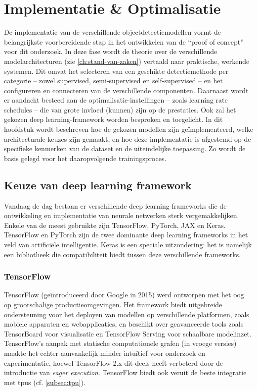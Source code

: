 \chapter{Implementatie \& Optimalisatie}
\label{ch:implementatie}

De implementatie van de verschillende objectdetectiemodellen vormt de belangrijkste voorbereidende stap in het ontwikkelen van de ``proof of concept'' voor dit onderzoek. In deze fase wordt de theorie over de verschillende modelarchitecturen (zie \ref{ch:stand-van-zaken}) vertaald naar praktische, werkende systemen. Dit omvat het selecteren van een geschikte detectiemethode per categorie -- zowel supervised, semi-supervised en self-supervised -- en het configureren en connecteren van de verschillende componenten. Daarnaast wordt er aandacht besteed aan de optimalisatie-instellingen -- zoals learning rate schedules -- die van grote invloed (kunnen) zijn op de prestaties. Ook zal het gekozen deep learning-framework worden besproken en toegelicht. In dit hoofdstuk wordt beschreven hoe de gekozen modellen zijn geïmplementeerd, welke architecturale keuzes zijn gemaakt, en hoe deze implementatie is afgestemd op de specifieke kenmerken van de dataset en de uiteindelijke toepassing. Zo wordt de basis gelegd voor het daaropvolgende trainingsproces.

\section{Keuze van deep learning framework}

Vandaag de dag bestaan er verschillende deep learning frameworks die de ontwikkeling en implementatie van neurale netwerken sterk vergemakkelijken. Enkele van de meest gebruikte zijn TensorFlow, PyTorch, JAX en Keras. TensorFlow en PyTorch zijn de twee dominante deep learning frameworks in het veld van artificiële intelligentie. Keras is een speciale uitzondering: het is namelijk een bibliotheek die compatibiliteit biedt tussen deze verschillende frameworks.

\subsection{TensorFlow}

TensorFlow (geïntroduceerd door Google in 2015) werd ontworpen met het oog op grootschalige productieomgevingen. Het framework biedt uitgebreide ondersteuning voor het deployen van modellen op verschillende platformen, zoals mobiele apparaten en webapplicaties, en beschikt over geavanceerde tools zoals TensorBoard voor visualisatie en TensorFlow Serving voor schaalbare modelinzet. TensorFlow’s aanpak met statische computationele grafen (in vroege versies) maakte het echter aanvankelijk minder intuïtief voor onderzoek en experimentatie, hoewel TensorFlow 2.x dit deels heeft verbeterd door de introductie van \emph{eager execution}. TensorFlow biedt ook veruit de beste integratie met \glspl{tpu} (cf. \ref{subsec:tpu}).

